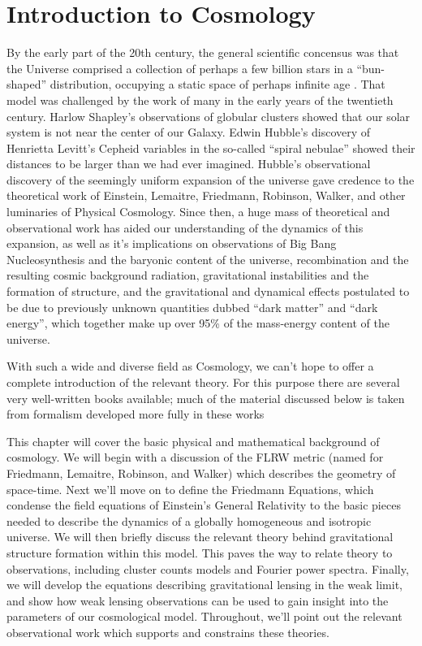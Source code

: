 \chapter{Introduction to Cosmology}

By the early part of the 20th century, the general scientific concensus
was that the Universe comprised a collection of perhaps a few billion
stars in a ``bun-shaped'' distribution, occupying a static space
of perhaps infinite age \citep{smith2009expanding}.
That model was challenged by the work of many in the early years of the
twentieth century.
Harlow Shapley's observations of globular clusters showed that our solar
system is not near the center of our Galaxy. Edwin Hubble's discovery of
Henrietta Levitt's Cepheid variables in the so-called ``spiral nebulae''
showed their distances to be larger than we had ever imagined.  Hubble's
observational discovery of the seemingly uniform expansion of the
universe gave credence to the theoretical work of Einstein, Lemaitre,
Friedmann, Robinson, Walker, and other luminaries of Physical Cosmology.
Since then, a huge mass of theoretical and observational work has aided
our understanding of the dynamics of this expansion, as
well as it's implications on observations of Big Bang Nucleosynthesis
and the baryonic content of the universe,
recombination and the resulting cosmic background radiation,
gravitational instabilities and the formation of structure,
and the gravitational and dynamical effects postulated to be due to
previously unknown quantities dubbed
``dark matter'' and ``dark energy'', which together
make up over 95\% of the mass-energy content of the universe.

With such a wide and diverse field as Cosmology, we can't hope to offer
a complete introduction of the relevant theory.  For this purpose there
are several very well-written books available; much of the material
discussed below is taken from formalism developed more fully in these works
\citep[see, e.g.][]{ryden2003cosmology, peebles1993principles, peacock1999cosmological}

This chapter will cover the basic physical and mathematical background of
cosmology.  We will begin with a discussion of the
FLRW metric (named for Friedmann, Lemaitre,
Robinson, and Walker) which describes the geometry of space-time.
Next we'll move on to define the Friedmann Equations, which condense
the field equations of Einstein's General Relativity to the basic pieces
needed to describe the dynamics of a globally homogeneous and isotropic
universe.  We will then briefly discuss the relevant theory behind
gravitational structure formation within this model.
This paves the way to relate theory to observations, including cluster counts
models and Fourier power spectra.
Finally, we will develop the equations describing gravitational lensing
in the weak limit, and show how weak lensing observations can be used
to gain insight into the parameters of our cosmological model.
Throughout, we'll point out the relevant observational work which supports
and constrains these theories.

